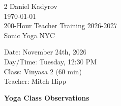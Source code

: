 \documentclass[10pt]{article}
\begin{document}
 
\thispagestyle{empty}

\begin{multicols}{2}
    \noindent
    Daniel Kadyrov\\
    \today\\
    200-Hour Teacher Training 2026-2027\\
    Sonic Yoga NYC
    \columnbreak
    \begin{flushright}
      Date: November 24th, 2026\\
      Day/Time: Tuesday, 12:30 PM\\
      Class: Vinyasa 2 (60 min)\\
      Teacher: Mitch Hipp\\
    \end{flushright}
\end{multicols}


\vspace{1em}
\begin{center}
  \textbf{Yoga Class Observations}
\end{center}
\end{document}
